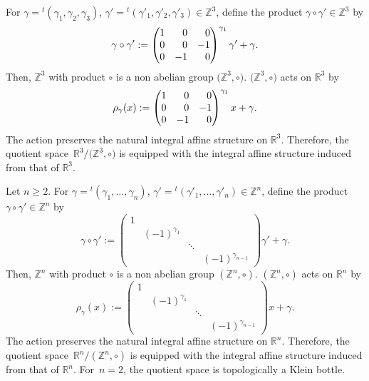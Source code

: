 \documentclass[10pt,a4paper]{amsart}
\numberwithin{equation}{section}
\newcommand{\R}{\mathbb{R}}
\newcommand{\Z}{\mathbb{Z}}
\begin{document}
\begin{Example}
For $\gamma={}^t(\gamma_1, \gamma_2, \gamma_3)$, $\gamma'={}^t(\gamma'_1, \gamma'_2, \gamma'_3)\in \Z^3$, define the product $\gamma\circ \gamma' \in \Z^3$ by
\[
\gamma\circ \gamma':=
\begin{pmatrix}
1 & \hphantom{-}0 & \hphantom{-}0 \\
0 & \hphantom{-}0 & -1 \\
0 & -1 & \hphantom{-}0
\end{pmatrix}^{\gamma_1}
\gamma'+\gamma.
\]
Then, $\Z^3$ with product $\circ$ is a non abelian group $\bigl(\Z^3,\circ \bigr)$. $\bigl(\Z^3,\circ \bigr)$ acts on $\R^3$ by
\[
\rho_\gamma(x):=
\begin{pmatrix}
1 & \hphantom{-}0 & \hphantom{-}0 \\
0 & \hphantom{-}0 & -1 \\
0 & -1 & \hphantom{-}0
\end{pmatrix}^{\gamma_1}
x+\gamma.
\]
The action preserves the natural integral affine structure on $\R^3$. Therefore, the quotient space~${\R^3/\bigl(\Z^3,\circ \bigr)}$ is equipped with the integral affine structure induced from that of $\R^3$.
\end{Example}

\begin{Example}
Let $n\ge 2$. For $\gamma={}^t(\gamma_1, \ldots, \gamma_n)$, $\gamma'={}^t(\gamma'_1, \ldots, \gamma'_n)\in \Z^n$, define the product~${\gamma\circ \gamma' \in \Z^n}$ by
\[
\gamma\circ \gamma':=
\begin{pmatrix}
1 & & & \\
 & (-1)^{\gamma_1} & & \\
 & & \ddots & \\
 & & & (-1)^{\gamma_{n-1}}
\end{pmatrix}
\gamma'+\gamma.
\]
Then, $\Z^n$ with product $\circ$ is a non abelian group $(\Z^n,\circ )$. $(\Z^n,\circ )$ acts on $\R^n$ by
\[
\rho_\gamma(x):=
\begin{pmatrix}
1 & & & \\
 & (-1)^{\gamma_1} & & \\
 & & \ddots & \\
 & & & (-1)^{\gamma_{n-1}}
\end{pmatrix}
x+\gamma.
\]
The action preserves the natural integral affine structure on $\R^n$. Therefore, the quotient space~${\R^n/(\Z^n,\circ )}$ is equipped with the integral affine structure induced from that of $\R^n$. For~${n\!=\!2}$, the quotient space is topologically a Klein bottle.
\end{Example}
\end{document}
